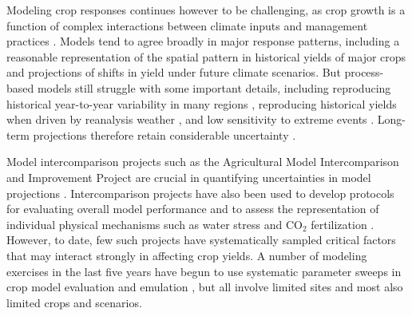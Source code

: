 \documentclass[gmd, manuscript]{copernicus} %
\begin{document}
Modeling crop responses continues however to be challenging, as crop growth is a function of complex interactions between climate inputs and management practices \citep{Boote13,rotter2011}. 
Models tend to agree broadly in major response patterns, including a reasonable representation of the spatial pattern in historical yields of major crops \citep[e.g.][]{Elliott2015, muller_global_2017} and projections of shifts in yield under future climate scenarios. 
But process-based models still struggle with some important details, including reproducing historical year-to-year variability in many regions \citep[e.g.][]{muller_global_2017}, reproducing historical yields when driven by reanalysis weather \citep[e.g.][]{Glotter14}, and low sensitivity to extreme events \citep[e.g.][]{Glotter15, Jag2018, schewe2019}. 
Long-term projections therefore retain considerable uncertainty \citep{WOLF2002217, JAGTAP200273, Iizumi2010, ANGULO201332, Asseng2013, Asseng2015}. 

Model intercomparison projects such as the Agricultural Model Intercomparison and Improvement Project \citep[AgMIP, ][]{ROSENZWEIG2013} are crucial in quantifying uncertainties in model projections \citep{Rosenzweig2014}. Intercomparison projects have also been used to develop protocols for evaluating overall model performance \citep{Elliott2015, muller_global_2017} and to assess the representation of individual physical mechanisms such as water stress and CO$_2$ fertilization \citep[e.g.][]{Schauberger2017}.
However, to date, few such projects have systematically sampled critical factors that may interact strongly in affecting crop yields. A number of modeling exercises in the last five years have begun to use
systematic parameter sweeps in crop model evaluation and emulation  \citep[e.g.][]{ruane2014, Markowski2015, Pirttioja2015,FRONZEK20182, Snyder2018, RUIZRAMOS2018}, but all involve limited sites and most also limited crops and scenarios. 

\end{document}
